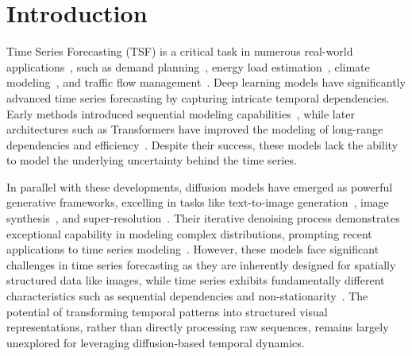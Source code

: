 \vspace{-2em}
\section{Introduction}
Time Series Forecasting (TSF) is a critical task in numerous real-world applications~\cite{jin2024survey}, such as demand planning~\cite{leonard2001promotional}, energy load estimation~\cite{liu2023sadi}, climate modeling~\cite{schneider1974climate}, and traffic flow management~\cite{zheng2006short}. Deep learning models have significantly advanced time series forecasting by capturing intricate temporal dependencies. Early methods introduced sequential modeling capabilities~\cite{cho2014learning,hochreiter1997long}, while later architectures such as Transformers have improved the modeling of long-range dependencies and efficiency~\cite{nie2022time,zhou2021informer,zhou2022fedformer,wu2021autoformer,woo2022etsformer}. Despite their success, these models lack the ability to model the underlying uncertainty behind the time series.

In parallel with these developments, diffusion models have emerged as powerful generative frameworks, excelling in tasks like text-to-image generation~\cite{rombach2022high}, image synthesis~\cite{ho2020denoising}, and super-resolution~\cite{saharia2022palette}. Their iterative denoising process demonstrates exceptional capability in modeling complex distributions, prompting recent applications to time series modeling~\cite{rasul2021autoregressive,shen2024multi,shen2023non,tashiro2021csdi,yan2021scoregrad}. However, these models face significant challenges in time series forecasting as they are inherently designed for spatially structured data like images, while time series exhibits fundamentally different characteristics such as sequential dependencies and non-stationarity~\cite{box2015time,hamilton2020time}. The potential of transforming temporal patterns into structured visual representations, rather than directly processing raw sequences, remains largely unexplored for leveraging diffusion-based temporal dynamics.


